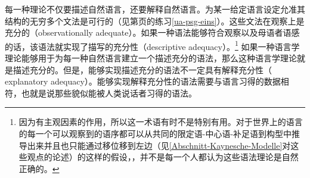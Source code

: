 每一种理论不仅要描述自然语言，还要解释自然语言。为某一给定语言设定允准其结构的无穷多个文法是可行的（见第\pageref{ua-psg-eins}页的练习\ref{ua-psg-eins}）。这些文法在观察上是充分的（observationally adequate）。如果一种语法能够符合观察以及母语者语感的话，该语法就实现了描写的充分性（descriptive adequacy）。\footnote{%
因为有主观因素的作用，所以这一术语有时不是特别有用。对于世界上的语言的每一个可以观察到的语序都可以从共同的限定语-中心语-补足语到构型中推导出来并且也只能通过移位移到左边（见\ref{Abschnitt-Kaynesche-Modelle}对这些观点的论述）的这样的假设，，并不是每一个人都认为这些语法理论是自然正确的。
}
如果一种语言学理论能够用于为每一种自然语言建立一个描述充分的语法，那么这种语言学理论就是描述充分的。但是，能够实现描述充分的语法不一定具有解释充分性（ explanatory adequacy）。能够实现解释充分性的语法需要与语言习得的数据相符，也就是说那些貌似能被人类说话者习得的语法\citep[--25]{Chomsky65a}。

